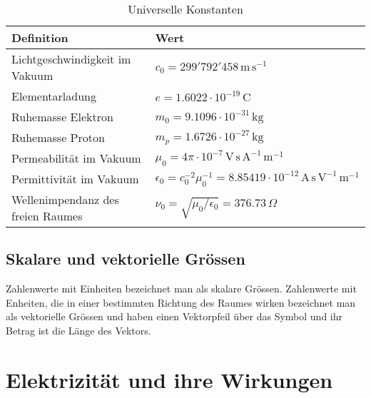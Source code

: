 \begin{table}[H]
\centering
\begin{tabular}{ll}
\hline
Definition&Wert\\\hline
Lichtgeschwindigkeit im Vakuum&$c_0=299'792'458\,\text{m}\,\text{s}^{-1}$\\
Elementarladung&$e=1.6022\cdot 10^{-19}\,\text{C}$\\
Ruhemasse Elektron&$m_0=9.1096\cdot 10^{-31}\,\text{kg}$\\
Ruhemasse Proton&$m_p=1.6726\cdot 10^{-27}\,\text{kg}$\\
Permeabilität im Vakuum&$\mu_0=4\pi\cdot 10^{-7}\,\text{V}\,\text{s}\,\text{A}^{-1}\,\text{m}^{-1}$\\
Permittivität im Vakuum&$\epsilon_0=c_0^{-2}\mu_0^{-1}=8.85419\cdot 10^{-12}\,\text{A}\,\text{s}\,\text{V}^{-1}\,\text{m}^{-1}$\\
Wellenimpendanz des freien Raumes&$\nu_0=\sqrt{\mu_0/\epsilon_0}=376.73\,\Omega$\\\hline
\end{tabular}
\caption{Universelle Konstanten}
\end{table}
\subsection{Skalare und vektorielle Grössen}
Zahlenwerte mit Einheiten bezeichnet man als skalare Grössen. Zahlenwerte mit Enheiten, die in einer bestimmten Richtung des Raumes wirken bezeichnet man als vektorielle Grössen und haben einen Vektorpfeil über das Symbol und ihr Betrag ist die Länge des Vektors.
\section{Elektrizität und ihre Wirkungen}
